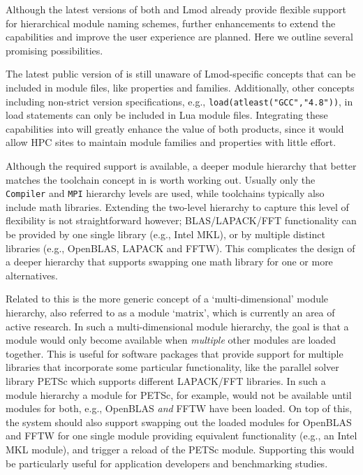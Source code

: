 Although the latest versions of both \easybuild{} and Lmod already provide
flexible support for hierarchical module naming schemes, further enhancements
to extend the capabilities and improve the user experience are planned.
Here we outline several promising possibilities.

The latest public version of \easybuild{} is still unaware of Lmod-specific
concepts that can be included in module files, like properties and families.
Additionally, other concepts including non-strict version specifications, e.g.,
\texttt{\small load(atleast("GCC","4.8"))}, in 
load statements can only be included in Lua module files.
Integrating these capabilities into \easybuild{} will
greatly enhance the value of both products, since it would allow HPC sites to
maintain module families and properties with little effort.

Although the required support is available, a deeper module hierarchy that
better matches the toolchain concept in \easybuild{} is worth working out.
Usually only the \texttt{Compiler} and \texttt{MPI} hierarchy levels are used,
while \easybuild{} toolchains typically also include math libraries. Extending
the two-level hierarchy to capture this level of flexibility is not straightforward
however; BLAS/LAPACK/FFT functionality can be provided by one single library (e.g.,
Intel MKL), or by multiple distinct libraries (e.g., OpenBLAS, LAPACK and FFTW).
This complicates the design of a deeper hierarchy that supports swapping one
math library for one or more alternatives.

Related to this is the more generic concept of a `multi-dimensional' module hierarchy,
also referred to as a module `matrix', which is currently an area of active research.
In such a multi-dimensional module hierarchy, the goal is that a module would
only become available when \emph{multiple} other modules are loaded together. This is
useful for software packages that provide support for multiple libraries that
incorporate some particular functionality, like the parallel
solver library PETSc which supports different LAPACK/FFT libraries. In such a module
hierarchy a module for PETSc, for example, would not be available until modules
for both, e.g., OpenBLAS \emph{and} FFTW have been loaded. On top of this, the system
should also support swapping out the loaded modules for OpenBLAS and FFTW for one
single module providing equivalent functionality (e.g., an Intel MKL module), and
trigger a reload of the PETSc module. Supporting this would be particularly useful for
application developers and benchmarking studies.

